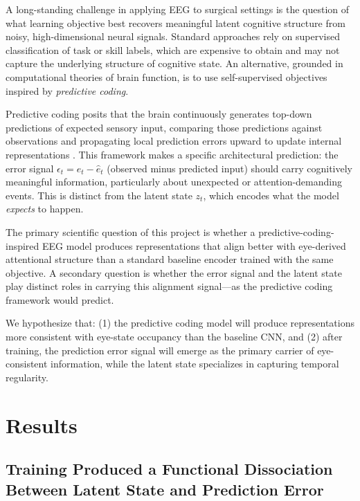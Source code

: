\documentclass[11pt, letterpaper]{article}
\begin{document}
A long-standing challenge in applying EEG to surgical settings is the question of what
learning objective best recovers meaningful latent cognitive structure from
noisy, high-dimensional neural signals. Standard approaches rely on supervised
classification of task or skill labels, which are expensive to obtain and may not
capture the underlying structure of cognitive state. An alternative, grounded in
computational theories of brain function, is to use self-supervised objectives inspired
by \textit{predictive coding}.

Predictive coding posits that the brain continuously generates top-down predictions of
expected sensory input, comparing those predictions against observations and propagating
local prediction errors upward to update internal representations
\citep{whittington2019theories}. This framework makes a specific architectural
prediction: the error signal $\epsilon_t = e_t - \hat{e}_t$ (observed minus predicted
input) should carry cognitively meaningful information, particularly about unexpected or
attention-demanding events. This is distinct from the latent state $z_t$, which
encodes what the model \textit{expects} to happen.

The primary scientific question of this project is whether a predictive-coding-inspired
EEG model produces representations that align better with eye-derived attentional
structure than a standard baseline encoder trained with the same objective. A secondary
question is whether the error signal and the latent state play distinct roles in
carrying this alignment signal---as the predictive coding framework would predict.

We hypothesize that: (1) the predictive coding model will produce representations more
consistent with eye-state occupancy than the baseline CNN, and (2) after training, the
prediction error signal will emerge as the primary carrier of eye-consistent
information, while the latent state specializes in capturing temporal regularity.

\section{Results}

\subsection{Training Produced a Functional Dissociation Between Latent State and Prediction Error}
\end{document}
